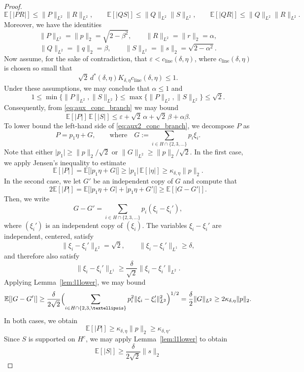 \documentclass[10pt,a4paper]{amsart}
\newcommand{\E}{\mathbb E}
\newcommand{\abs}[1]{\lvert #1 \rvert}
\newcommand{\eps}{\varepsilon}
\newcommand{\norm}[1]{\lVert #1 \rVert}
\begin{document}
\begin{proof}
	\[
	\E[\abs{PR}]\le \norm{P}_{L^2}\norm{R}_{L^2},
	\qquad
	\E[\abs{QS}]\le \norm{Q}_{L^2}\norm{S}_{L^2},
	\qquad
	\E[\abs{QR}]\le \norm{Q}_{L^2}\norm{R}_{L^2}.
	\]
	Moreover, we have the identities
	\[
	\norm{P}_{L^2}=\norm{p}_2=\sqrt{2-\beta^2},
	\qquad
	\norm{R}_{L^2}=\norm{r}_2=\alpha,
	\]
	\[
	\norm{Q}_{L^2}=\norm{q}_2=\beta,
	\qquad
	\norm{S}_{L^2}=\norm{s}_2=\sqrt{2-\alpha^2}.
	\]
	Now assume, for the sake of contradiction, that $\eps<c_{\mathrm{line}}(\delta,\eta)$, where
	$c_{\mathrm{line}}(\delta,\eta)$ is chosen so small that
	\[
	\sqrt2\,d^*(\delta,\eta)K_{\delta,\eta}c_{\mathrm{line}}(\delta,\eta)\le1.
	\]
	Under these assumptions, we may conclude that $\alpha\le1$ and
	\[
    1\le \min\{\|P\|_{L^2},\|S\|_{L^2}\}\le \max\{\|P\|_{L^2},\|S\|_{L^2}\} 
	\le \sqrt{2}.
	\]
	Consequently, from \eqref{eq:aux_conc_branch} we may bound
	\begin{equation}
    \label{eq:aux2_conc_branch}
	\E[\abs{P}]\,\E[\abs{S}]
	\le
	\eps+\sqrt2\,\alpha+\sqrt2\,\beta+\alpha\beta.
	\end{equation}
	To lower bound the left-hand side of \eqref{eq:aux2_conc_branch}, we decompose $P$ as 
	\[
	P=p_1\eta+G,
	\qquad \text{where} \quad 
	G:=\sum_{i\in H\cap\{2,3,\dots\}} p_i\xi_i.
	\]
	Note that either $\abs{p_1}\ge \norm{p}_2/\sqrt2$ or $\norm{G}_{L^2}\ge \norm{p}_2/\sqrt2$.
	In the first case, we apply Jensen's inequality to estimate
	\[
	\E[\abs{P}]
	=\E\bigl[\abs{p_1\eta+G}\bigr]
	\ge
	\abs{p_1}\,\E[\abs{\eta}]
	\ge
	\kappa_{\delta,\eta}\norm{p}_2.
	\]
	In the second case, we let $G'$ be an independent copy of $G$ and compute that
	\[
	2\E[\abs{P}]
	=\E\bigl[\abs{p_1\eta+G}+\abs{p_1\eta+G'}\bigr]
	\ge \E[\abs{G-G'}].
	\]
	Then, we write
	\[
	G-G'
	=
	\sum_{i\in H\cap\{2,3,\dots\}} p_i(\xi_i-\xi_i'),
	\]
	where $(\xi_i')$ is an independent copy of $(\xi_i)$.  The variables
	$\xi_i-\xi_i'$ are independent, centered, satisfy
	\[
	\norm{\xi_i-\xi_i'}_{L^2}=\sqrt2,
	\qquad
	\norm{\xi_i-\xi_i'}_{L^1}\ge \delta,
	\]
	and therefore also satisfy
	\[
	\norm{\xi_i-\xi_i'}_{L^1}
	\ge \frac{\delta}{\sqrt2}\norm{\xi_i-\xi_i'}_{L^2}.
	\]
	Applying Lemma~\ref{lem:l1lower}, we may bound
	\[
	\E[\abs{G-G'}]
	\ge
	\frac{\delta}{2\sqrt2}
	\Bigl(\sum_{i\in H\cap\{2,3,\dots\}} p_i^2
	\norm{\xi_i-\xi_i'}_{L^2}^2\Bigr)^{1/2}
	=\frac{\delta}{2}\norm{G}_{L^2}
	\ge 2\kappa_{\delta,\eta}\norm{p}_2.
	\]
	In both cases, we obtain
	\[
	\E[\abs{P}]
	\ge \kappa_{\delta,\eta}\norm{p}_2
	\ge \kappa_{\delta,\eta}.
	\]
	Since $S$ is supported on $H^c$, we may apply
	Lemma~\ref{lem:l1lower} to obtain
	\[
	\E[\abs{S}]
	\ge \frac{\delta}{2\sqrt2}\norm{s}_2
\]
\end{proof}
\end{document}
